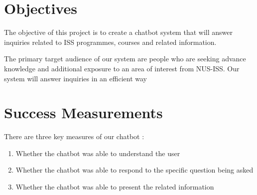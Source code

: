 \section{Objectives} %
\label{sec:objectives}
	The objective of this project is to create a chatbot system that will answer inquiries related to ISS programmes, courses and related information.

	The primary target audience of our system are people who are seeking advance knowledge and additional exposure to an area of interest from NUS-ISS. Our system will answer inquiries in an efficient way


\section{Success Measurements} %
\label{sec:success_measurements}
	There are three key measures of our chatbot \cite{successmeasure}:
	\begin{enumerate}
		\item Whether the chatbot was able to understand the user
		\item Whether the chatbot was able to respond to the specific question being asked
		\item Whether the chatbot was able to present the related information
	\end{enumerate}


